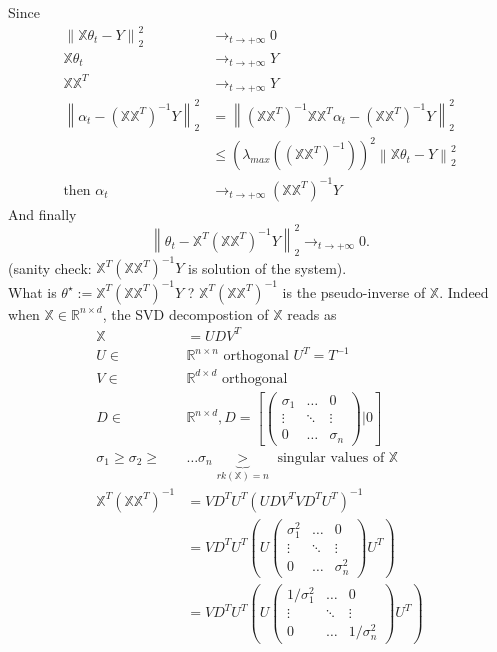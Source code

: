 Since \begin{align*}
    \left\| \mathbb{X} \theta _t - Y  \right\| _2 ^2 &\to _{t \to +\infty } 0 \\
    \mathbb{X} \theta _t &\to _{t \to +\infty } Y \\
    \mathbb{X} \mathbb{X} ^T &\to _{t \to +\infty } Y \\
    \left\| \alpha _t - (\mathbb{X} \mathbb{X} ^T)^{-1} Y \right\| _2 ^2 
        &= \left\| (\mathbb{X} \mathbb{X}^T)^{-1} \mathbb{X} \mathbb{X}^T \alpha _t - (\mathbb{X} \mathbb{X} ^T)^{-1} Y \right\| _2 ^2 \\ 
        &\leq (\lambda _{max} ( (\mathbb{X} \mathbb{X} ^T)^{-1} ))^2 \left\| \mathbb{X} \theta _t - Y \right\| _2 ^2 \\
    \text{then } \alpha _t &\to _{t \to +\infty } (\mathbb{X} \mathbb{X}^T)^{-1} Y
\end{align*}
And finally
\[
    \left\| \theta _t - \mathbb{X} ^T (\mathbb{X} \mathbb{X} ^T)^{-1} Y \right\| _2 ^2 \to _{t \to +\infty } 0
.\]
(sanity check: $ \mathbb{X}^T ( \mathbb{X} \mathbb{X} ^T)^{-1} Y $ is solution of the system). \\
What is $ \theta ^\star := \mathbb{X}^T (\mathbb{X} \mathbb{X}^T)^{-1} Y $ ? $ \mathbb{X}^T (\mathbb{X} \mathbb{X}^T)^{-1} $ is the pseudo-inverse of $ \mathbb{X} $. Indeed when $ \mathbb{X} \in \mathbb{R}^{n \times d} $, the SVD decompostion of $ \mathbb{X}  $ reads as 
\begin{align*}
    \mathbb{X} &= U D V^T \\
    U \in& \mathbb{R}^{n \times n} \text{ orthogonal } U^T = T^{-1} \\
    V \in& \mathbb{R }^{d \times d} \text{ orthogonal} \\
    D \in& \mathbb{R }^{n \times d}, D = [ \begin{pmatrix}
        \sigma _1 & \dots  & 0 \\
        \vdots  & \ddots & \vdots \\
        0 & \dots & \sigma _n
    \end{pmatrix} | 0 ] \\
    \sigma _1 \geq \sigma _2 \geq& \dots \sigma _n \underbrace{>}_{rk(\mathbb{X}) = n} \text{ singular values of } \mathbb{X} \\
    \mathbb{X} ^T (\mathbb{X} \mathbb{X}^T)^{-1} 
        &= V D^T U^T ( UDV^T VD^T U^T)^{-1} \\
        &= VD^T U^T (U \begin{pmatrix}
            \sigma _1 ^2 & \dots  & 0 \\
            \vdots  & \ddots & \vdots \\
            0 & \dots & \sigma _n ^2
        \end{pmatrix} U^T) \\
        &= V D^T U ^T ( U \begin{pmatrix}
            1 / \sigma _1 ^2 & \dots  & 0 \\
            \vdots  & \ddots & \vdots \\
            0 & \dots & 1/ \sigma _n ^2
        \end{pmatrix} U^T)
\end{align*}
